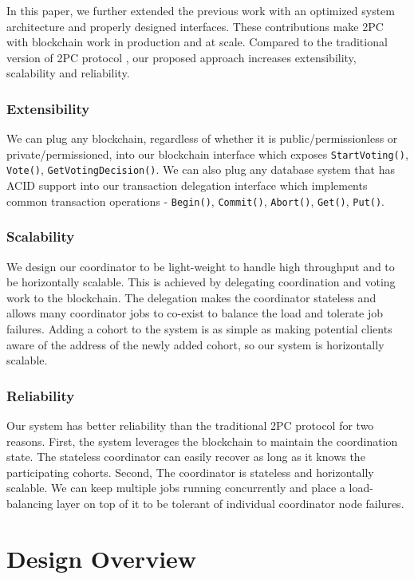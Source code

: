 \documentclass[11pt,conference]{IEEEtran}
\begin{document}
In this paper, we further extended the previous work with an optimized system architecture and properly designed interfaces. These contributions make 2PC with blockchain work in production and at scale. Compared to the traditional version of 2PC protocol \cite{lampson1993new}, our proposed approach increases extensibility, scalability and reliability.

\subsubsection{Extensibility}
We can plug any blockchain, regardless of whether it is public/permissionless or private/permissioned, into our blockchain interface which exposes \texttt{StartVoting()}, \texttt{Vote()}, \texttt{GetVotingDecision()}. We can also plug any database system that has ACID support into our transaction delegation interface which implements common transaction operations - \texttt{Begin()}, \texttt{Commit()}, \texttt{Abort()}, \texttt{Get()}, \texttt{Put()}.

\subsubsection{Scalability}
We design our coordinator to be light-weight to handle high throughput and to be horizontally scalable. This is achieved by delegating coordination and voting work to the blockchain. The delegation makes the coordinator stateless and allows many coordinator jobs to co-exist to balance the load and tolerate job failures. Adding a cohort to the system is as simple as making potential clients aware of the address of the newly added cohort, so our system is horizontally scalable.

\subsubsection{Reliability}
Our system has better reliability than the traditional 2PC protocol for two reasons. First, the system leverages the blockchain to maintain the coordination state. The stateless coordinator can easily recover as long as it knows the participating cohorts. Second, The coordinator is stateless and horizontally scalable. We can keep multiple jobs running concurrently and place a load-balancing layer on top of it to be tolerant of individual coordinator node failures.

\section{Design Overview}
\end{document}
